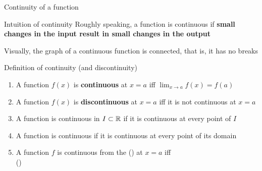 \documentclass[9pt]{beamer}
\begin{document}
\begin{frame}{Continuity of a function}

    \vspace{0.3cm}

    
    \begin{block}{Intuition of continuity}
        Roughly speaking, a function is continuous if \textbf{small changes in the input result in small changes in the output}

        Visually, the graph of a continuous function is connected, that is, it has no breaks
    \end{block}
    
    \begin{block}{Definition of continuity (and discontinuity)}
    
        \begin{enumerate}[leftmargin = 0.5cm, label = $\bullet$, rightmargin = 0.2cm]
        
        \item A function $f(x)$ is \textbf{continuous} at $x = a$ iff $\lim_{x\rightarrow a}f(x) = f(a)$

        \item A function $f(x)$ is \textbf{discontinuous} at $x = a$ iff it is not continuous at $x = a$

        \item A function is continuous in $I \subset \mathbb{R}$ if it is continuous at every point of $I$

        \item A function is continuous if it is continuous at every point of its domain

        \item A function $f$ is continuous from the  () at $x = a$ iff \\
         ()
        
        \end{enumerate}
    \end{block}
    \vspace{-0cm}

\end{frame}
\end{document}
